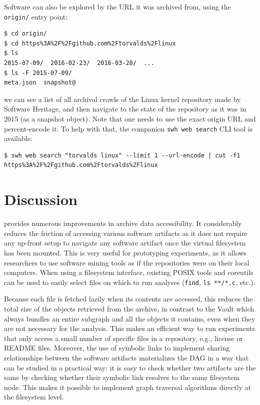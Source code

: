 Software can also be explored by the URL it was archived from, using the
\texttt{origin/} entry point:

\begin{verbatim}
$ cd origin/
$ cd https%3A%2F%2Fgithub.com%2Ftorvalds%2Flinux
$ ls
2015-07-09/  2016-02-23/  2016-03-28/  ...
$ ls -F 2015-07-09/
meta.json  snapshot@
\end{verbatim}

we can see a list of all archival crawls of the Linux kernel repository made by
Software Heritage, and then navigate to the state of the repository as it was
in 2015 (as a snapshot object). Note that one needs to use the exact origin URL
and percent-encode it. To help with that, the companion \texttt{swh web search}
CLI tool is available:

\begin{verbatim}
$ swh web search "torvalds linux" --limit 1 --url-encode | cut -f1
https%3A%2F%2Fgithub.com%2Ftorvalds%2Flinux
\end{verbatim}


\section{Discussion}

\SWHFS{} provides numerous improvements in archive data accessibility.
It considerably reduces the friction of accessing various software artifacts as
it does not require any up-front setup to navigate any software artifact once
the virtual filesystem has been mounted. This is very useful for prototyping
experiments, as it allows researchers to use software mining tools as if the
repositories were on their local computers. When using a filesystem interface,
existing POSIX tools and coreutils can be used to easily select files on which
to run analyses (\texttt{find}, \texttt{ls **/*.c},
etc.).

Because each file is fetched lazily when its contents are accessed, this
reduces the total size of the objects retrieved from the archive, in contrast
to the Vault which always bundles an entire subgraph and all the objects it
contains, even when they are not necessary for the analysis. This makes
\SWHFS{} an efficient way to run experiments that only access a small number of
specific files in a repository, e.g., license or README files.
Moreover, the use of symbolic links to implement sharing relationships between
the software artifacts materializes the DAG in a way that can be studied in a
practical way: it is easy to check whether two artifacts are the same by
checking whether their symbolic link resolves to the same filesystem node. This
makes it possible to implement graph traversal algorithms directly at the
filesystem level.

